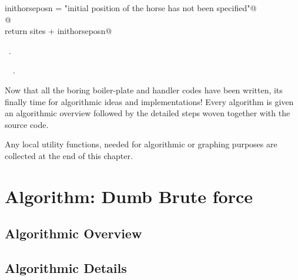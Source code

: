\documentclass[11.5pt]{report}
\begin{document}
\begin{flushleft}
\begin{list}{}{}
\mbox{}\verb@              inithorseposn = "\nThe initial position of the horse has not been specified"@\\
\mbox{}\verb@              @\\
\mbox{}\verb@          return sites + inithorseposn@\\
\mbox{}\verb@@{\NWsep}
\end{list}
\vspace{-1.5ex}
\footnotesize
\begin{list}{}{\setlength{\itemsep}{-\parsep}\setlength{\itemindent}{-\leftmargin}}
\item \NWtxtMacroRefIn\ .
\item \NWtxtIdentsDefed\nobreak\  \verb@HorseFlyInput@\nobreak\ .
\item{}
\end{list}
\vspace{4ex}
\end{flushleft}
Now that all the boring boiler-plate and handler codes have been 
written, its finally time for algorithmic ideas and implementations! 
Every algorithm is given an algorithmic overview followed by the 
detailed steps woven together with the source code. 

Any local utility functions, needed for algorithmic or graphing purposes 
are collected at the end of this chapter. 

\newpage

\section{Algorithm: Dumb Brute force}

\subsection{Algorithmic Overview}

\subsection{Algorithmic Details}
\end{document}

